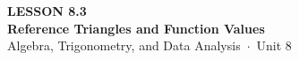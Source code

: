 \documentclass[aspectratio=169, 11pt]{beamer}
\begin{document}
{
\begin{frame}[plain]
  \vspace{2.8cm}\hspace{0.55cm}%
  \begin{minipage}{0.9\textwidth}
    {\color{goldacc}\bfseries\small LESSON 8.3}\\[0.5cm]
    {\color{white}\bfseries\LARGE Reference Triangles and Function Values}\\[1.2cm]
    {\color{mistmid}\small Algebra, Trigonometry, and Data Analysis~$\cdot$~Unit 8}
  \end{minipage}
\end{frame}
}

\begin{frame}[t, plain]
\end{frame}
\end{document}
